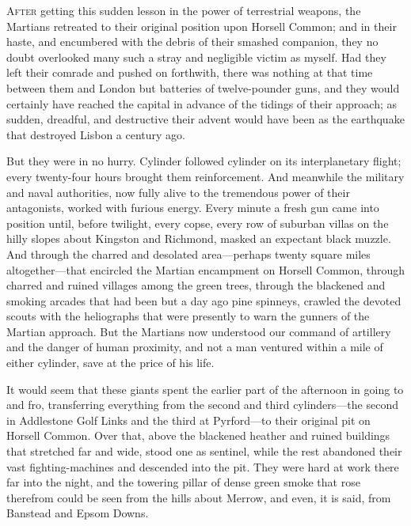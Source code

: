 


\lettrine[lines=4,findent=2pt]{A}{fter} getting this sudden lesson in the power of terrestrial weapons, the Martians retreated to their original position upon Horsell Common; and in their haste, and encumbered with the debris of their smashed companion, they no doubt overlooked many such a stray and negligible victim as myself. Had they left their comrade and pushed on forthwith, there was nothing at that time between them and London but batteries of twelve-pounder guns, and they would certainly have reached the capital in advance of the tidings of their approach; as sudden, dreadful, and destructive their advent would have been as the earthquake that destroyed Lisbon a century ago.

But they were in no hurry. Cylinder followed cylinder on its interplanetary flight; every twenty-four hours brought them reinforcement. And meanwhile the military and naval authorities, now fully alive to the tremendous power of their antagonists, worked with furious energy. Every minute a fresh gun came into position until, before twilight, every copse, every row of suburban villas on the hilly slopes about Kingston and Richmond, masked an expectant black muzzle. And through the charred and desolated area—perhaps twenty square miles altogether—that encircled the Martian encampment on Horsell Common, through charred and ruined villages among the green trees, through the blackened and smoking arcades that had been but a day ago pine spinneys, crawled the devoted scouts with the heliographs that were presently to warn the gunners of the Martian approach. But the Martians now understood our command of artillery and the danger of human proximity, and not a man ventured within a mile of either cylinder, save at the price of his life.

It would seem that these giants spent the earlier part of the afternoon in going to and fro, transferring everything from the second and third cylinders—the second in Addlestone Golf Links\label{cylinder2c} and the third at Pyrford—to their original pit on Horsell Common. Over that, above the blackened heather and ruined buildings that stretched far and wide, stood one as sentinel, while the rest abandoned their vast fighting-machines and descended into the pit. They were hard at work there far into the night, and the towering pillar of dense green smoke that rose therefrom could be seen from the hills about Merrow, and even, it is said, from Banstead and Epsom Downs.

